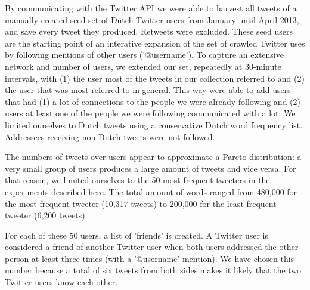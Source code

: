 \documentclass[11pt]{article}
\begin{document}

By communicating with the Twitter API we were able to harvest all tweets of a manually created seed set of Dutch Twitter users from January until April 2013, and save every tweet they produced. Retweets were excluded. These seed users are the starting point of an interative expansion of the set of crawled Twitter uses by following mentions of other users ('@username'). To capture an extensive network and number of users, we extended our set, repeatedly at 30-minute intervals, with (1) the user most of the tweets in our collection referred to and (2) the user that was most referred to in general. This way were able to add users that had (1) a lot of connections to the people we were already following and (2) users at least one of the people we were following communicated with a lot. We limited ourselves to Dutch tweets using a conservative Dutch word frequency list. Addressees receiving non-Dutch tweets were not followed.

The numbers of tweets over users appear to approximate a Pareto distribution: a very small group of users produces a large amount of tweets and vice versa. For that reason, we limited ourselves to the 50 most frequent tweeters in the experiments described here. The total amount of words ranged from 480,000 for the most frequent tweeter (10,317 tweets) to 200,000 for the least frequent tweeter (6,200 tweets). 

For each of these 50 users, a list of 'friends' is created. A Twitter user is considered a friend of another Twitter user when both users addressed the other person at least three times (with a '@username' mention). We have chosen this number because a total of six tweets from both sides makes it likely that the two Twitter users know each other. 
\end{document}
